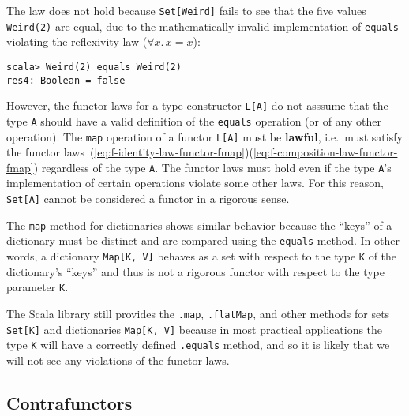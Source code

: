 The law does not hold because \lstinline!Set[Weird]! fails to see
that the five values \lstinline!Weird(2)! are equal, due to the mathematically
invalid implementation of \lstinline!equals! violating the reflexivity
law ($\forall x.\,x=x$):
\begin{lstlisting}
scala> Weird(2) equals Weird(2)
res4: Boolean = false
\end{lstlisting}
However, the functor laws for a type constructor \lstinline!L[A]!
do not asssume that the type \lstinline!A! should have a valid definition
of the \lstinline!equals! operation (or of any other operation).
The \lstinline!map! operation of a functor \lstinline!L[A]! must
be \textbf{lawful}, i.e.~must satisfy the
functor laws~(\ref{eq:f-identity-law-functor-fmap})\textendash (\ref{eq:f-composition-law-functor-fmap})
regardless of the type \lstinline!A!. The functor laws must hold
even if the type \lstinline!A!'s implementation of certain operations
violate some other laws. For this reason, \lstinline!Set[A]! cannot
be considered a functor in a rigorous sense.

The \lstinline!map! method for dictionaries shows similar behavior
because the ``keys'' of a dictionary must be distinct and are compared
using the \lstinline!equals! method. In other words, a dictionary
\lstinline!Map[K, V]! behaves as a set with respect to the type \lstinline!K!
of the dictionary's ``keys'' and thus is not a rigorous functor
with respect to the type parameter \lstinline!K!.

The Scala library still provides the \lstinline!.map!, \lstinline!.flatMap!,
and other methods for sets \lstinline!Set[K]! and dictionaries \lstinline!Map[K, V]!
because in most practical applications the type \lstinline!K! will
have a correctly defined \lstinline!.equals! method, and so it is
likely that we will not see any violations of the functor laws.

\subsection{Contrafunctors}

